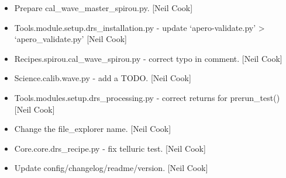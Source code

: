 \documentclass[a4paper,10pt,english]{report}
\begin{document}
\begin{itemize}
\item {} 
Prepare cal\_wave\_master\_spirou.py. {[}Neil Cook{]}

\item {} 
Tools.module.setup.drs\_installation.py - update ‘apero-validate.py’
\textendash{}\textgreater{} ‘apero\_validate.py’ {[}Neil Cook{]}

\item {} 
Recipes.spirou.cal\_wave\_spirou.py - correct typo in comment. {[}Neil
Cook{]}

\item {} 
Science.calib.wave.py - add a TODO. {[}Neil Cook{]}

\item {} 
Tools.modules.setup.drs\_processing.py - correct returns for
prerun\_test() {[}Neil Cook{]}

\item {} 
Change the file\_explorer name. {[}Neil Cook{]}

\item {} 
Core.core.drs\_recipe.py - fix telluric test. {[}Neil Cook{]}

\item {} 
Update config/changelog/readme/version. {[}Neil Cook{]}

\end{itemize}
\end{document}
